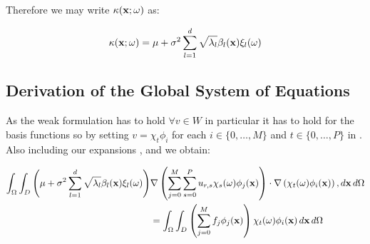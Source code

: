 Therefore we may write $\kappa(\mathbf{x};\omega)$ as:

\begin{equation}\label{eq:twod-stochastic-kl-kappa}
    \kappa(\mathbf{x};\omega) =
    \mu + \sigma^2\sum_{l=1}^d\sqrt{\lambda_l}\beta_l(\mathbf{x})\xi_l(\omega)
\end{equation}

\subsection{Derivation of the Global System of Equations}

As the weak formulation  has to hold $\forall v
\in W$ in particular it has to hold for the basis functions so by setting
$v = \chi_t\phi_i$ for each $i \in \{0, \ldots, M\}$ and $t \in \{0, \ldots, P\}$
in . Also including our expansions
,  and
 we obtain:

\begin{align}
  \begin{split}
    \int_\Omega\int_D
      \left(\mu + \sigma^2\sum_{l=1}^d\sqrt{\lambda_l}\beta_l(\mathbf{x})\xi_l(\omega)\right)
      &\nabla\left(\sum_{j=0}^M\sum_{s=0}^Pu_{r,s}\chi_s(\omega)\phi_j(\mathbf{x})\right)
      \cdot\nabla\left(\chi_t(\omega)\phi_i(\mathbf{x})\right), d\mathbf{x}\, d\Omega \\
      &= \int_\Omega\int_D\left(\sum_{j=0}^Mf_j\phi_j(\mathbf{x})\right)
        \chi_t(\omega)\phi_i(\mathbf{x})\, d\mathbf{x}\, d\Omega
  \end{split}
\end{align}
